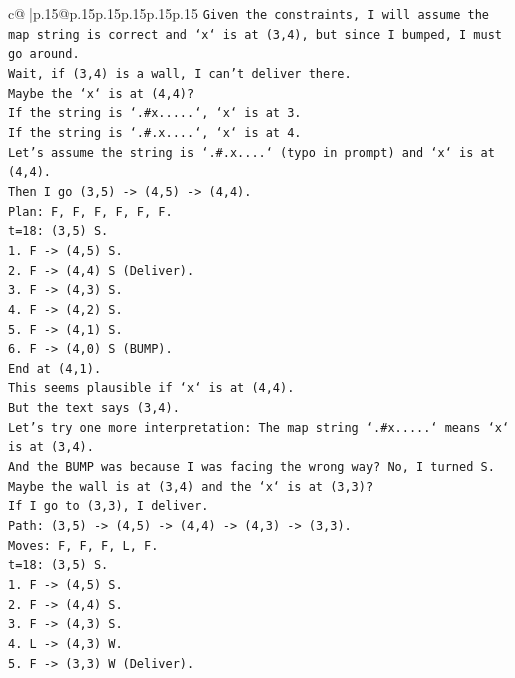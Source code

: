 \documentclass{article}
\begin{document}
{\begin{supertabular}{c@{$\;$}|p{.15\linewidth}@{}p{.15\linewidth}p{.15\linewidth}p{.15\linewidth}p{.15\linewidth}p{.15\linewidth}}
{{{\texttt{Given the constraints, I will assume the map string is correct and `x` is at (3,4), but since I bumped, I must go around.} \\
\texttt{Wait, if (3,4) is a wall, I can't deliver there.} \\
\texttt{Maybe the `x` is at (4,4)?} \\
\texttt{If the string is `.\#x.....`, `x` is at 3.} \\
\texttt{If the string is `.\#.x....`, `x` is at 4.} \\
\texttt{Let's assume the string is `.\#.x....` (typo in prompt) and `x` is at (4,4).} \\
\texttt{Then I go (3,5) {-}> (4,5) {-}> (4,4).} \\
\texttt{Plan: F, F, F, F, F, F.} \\
\texttt{t=18: (3,5) S.} \\
\texttt{1. F {-}> (4,5) S.} \\
\texttt{2. F {-}> (4,4) S (Deliver).} \\
\texttt{3. F {-}> (4,3) S.} \\
\texttt{4. F {-}> (4,2) S.} \\
\texttt{5. F {-}> (4,1) S.} \\
\texttt{6. F {-}> (4,0) S (BUMP).} \\
\texttt{End at (4,1).} \\
\texttt{This seems plausible if `x` is at (4,4).} \\
\texttt{But the text says (3,4).} \\
\texttt{Let's try one more interpretation: The map string `.\#x.....` means `x` is at (3,4).} \\
\texttt{And the BUMP was because I was facing the wrong way? No, I turned S.} \\
\texttt{Maybe the wall is at (3,4) and the `x` is at (3,3)?} \\
\texttt{If I go to (3,3), I deliver.} \\
\texttt{Path: (3,5) {-}> (4,5) {-}> (4,4) {-}> (4,3) {-}> (3,3).} \\
\texttt{Moves: F, F, F, L, F.} \\
\texttt{t=18: (3,5) S.} \\
\texttt{1. F {-}> (4,5) S.} \\
\texttt{2. F {-}> (4,4) S.} \\
\texttt{3. F {-}> (4,3) S.} \\
\texttt{4. L {-}> (4,3) W.} \\
\texttt{5. F {-}> (3,3) W (Deliver).} \\
}}}
\end{supertabular}}
\end{document}
